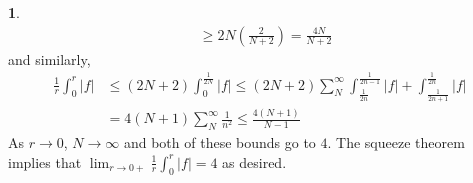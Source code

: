 \documentclass[10.5pt]{article}
\theoremstyle{definition}
\newtheorem{pb}{}
\newcommand{\abs}[1]{\left\vert#1\right\vert}
\begin{document}
\begin{pb}
\begin{align*}
            &\geq 2N(\frac{2}{N+2}) = \frac{4N}{N+2}
        \end{align*}
        and similarly,
        \begin{align*}
            \frac{1}{r}\int_0^r\abs{f} &\leq (2N+2)\int_0^{\frac{1}{2N}}\abs{f} 
            \leq (2N+2)\sum_N^\infty \int_{\frac{1}{2n}}^{\frac{1}{2n-1}}\abs{f} + \int_{\frac{1}{2n+1}}^{\frac{1}{2n}} \abs{f} \\
            &= 4(N+1)\sum_N^\infty \frac{1}{n^2} \leq \frac{4(N+1)}{N-1}
        \end{align*}
        As \(r \to 0\), \(N \to \infty\) and both of these bounds go to \(4\). The squeeze theorem implies that
        \(\lim_{r\to0+}\frac{1}{r}\int_0^r \abs{f} = 4\) as desired.
    \end{pb}
\end{document}
